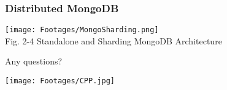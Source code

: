 \documentclass{beamer}
\begin{document}
\begin{frame} \small
\frametitle{Distributed MongoDB}
\begin{center}
\texttt{[image: Footages/MongoSharding.png]}\\
\scriptsize Fig. 2-4 Standalone and Sharding MongoDB Architecture
\end{center}
\end{frame}
\begin{frame} 
\begin{center}
\LARGE Any questions?
\end{center}
\end{frame}

\begin{frame}
\begin{center}
  \texttt{[image: Footages/CPP.jpg]}
\end{center}
\end{frame}
\end{document}

